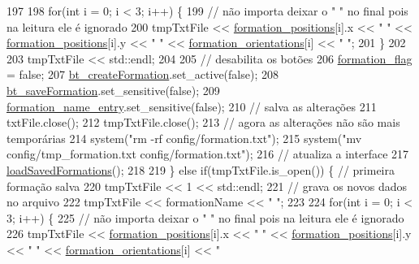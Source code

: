 \begin{DoxyCode}
197 
198         \textcolor{keywordflow}{for}(\textcolor{keywordtype}{int} i = 0; i < 3; i++) \{
199             \textcolor{comment}{// não importa deixar o " " no final pois na leitura ele é ignorado}
200             tmpTxtFile << \hyperlink{class_strategy_g_u_i_a4d2d15fe0a25b8d9d8fa56a4cf155ff0}{formation\_positions}[i].x << \textcolor{stringliteral}{" "} << 
      \hyperlink{class_strategy_g_u_i_a4d2d15fe0a25b8d9d8fa56a4cf155ff0}{formation\_positions}[i].y << \textcolor{stringliteral}{" "} << \hyperlink{class_strategy_g_u_i_ad8d7e6bbfceba5d6284c8825f37ea8a2}{formation\_orientations}[i] << \textcolor{stringliteral}{" 
      "};
201         \}
202 
203         tmpTxtFile << std::endl;
204 
205         \textcolor{comment}{// desabilita os botões}
206         \hyperlink{class_strategy_g_u_i_aaac145125516fb8b7fe7137db18cdb58}{formation\_flag} = \textcolor{keyword}{false};
207         \hyperlink{class_strategy_g_u_i_ab6edc11fb98709c98ad1815998aa937a}{bt\_createFormation}.set\_active(\textcolor{keyword}{false});
208         \hyperlink{class_strategy_g_u_i_ae68d7475f55a82e46d74eb8b3cd53b9e}{bt\_saveFormation}.set\_sensitive(\textcolor{keyword}{false});
209         \hyperlink{class_strategy_g_u_i_a19406b76eaf73c06545aa1c67c0636ce}{formation\_name\_entry}.set\_sensitive(\textcolor{keyword}{false});
210         \textcolor{comment}{// salva as alterações}
211         txtFile.close();
212         tmpTxtFile.close();
213         \textcolor{comment}{// agora as alterações não são mais temporárias}
214         system(\textcolor{stringliteral}{"rm -rf config/formation.txt"});
215         system(\textcolor{stringliteral}{"mv config/tmp\_formation.txt config/formation.txt"});
216         \textcolor{comment}{// atualiza a interface}
217         \hyperlink{class_strategy_g_u_i_a616a0f321878532cf85cfd02564758b5}{loadSavedFormations}();
218 
219     \} \textcolor{keywordflow}{else} \textcolor{keywordflow}{if}(tmpTxtFile.is\_open()) \{ \textcolor{comment}{// primeira formação salva}
220         tmpTxtFile << 1 << std::endl;
221         \textcolor{comment}{// grava os novos dados no arquivo}
222         tmpTxtFile << formationName << \textcolor{stringliteral}{" "};
223 
224         \textcolor{keywordflow}{for}(\textcolor{keywordtype}{int} i = 0; i < 3; i++) \{
225             \textcolor{comment}{// não importa deixar o " " no final pois na leitura ele é ignorado}
226             tmpTxtFile << \hyperlink{class_strategy_g_u_i_a4d2d15fe0a25b8d9d8fa56a4cf155ff0}{formation\_positions}[i].x << \textcolor{stringliteral}{" "} << 
      \hyperlink{class_strategy_g_u_i_a4d2d15fe0a25b8d9d8fa56a4cf155ff0}{formation\_positions}[i].y << \textcolor{stringliteral}{" "} << \hyperlink{class_strategy_g_u_i_ad8d7e6bbfceba5d6284c8825f37ea8a2}{formation\_orientations}[i] << \textcolor{stringliteral}{" 
}
\end{DoxyCode}
